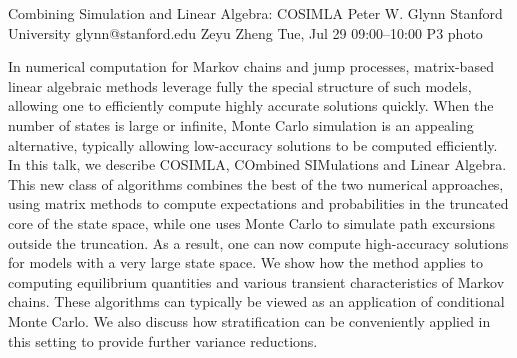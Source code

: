 \documentclass[12pt,lettersize,oneside]{book} %
\begin{document}
\clearpage
\begin{talk}
  {Combining Simulation and Linear Algebra: COSIMLA}%
  {Peter W. Glynn}%
  {Stanford University}%
  {glynn@stanford.edu}%
  {Zeyu Zheng}%
  {}%
  {Tue, Jul 29 09:00--10:00}%
  {P3}%
  {photo}%
  
    
   
In numerical computation for Markov chains and jump processes, matrix-based linear algebraic methods leverage fully the special structure of such models, allowing one to efficiently compute highly accurate solutions quickly. When the number of states is large or infinite, Monte Carlo simulation is an appealing alternative, typically allowing low-accuracy solutions to be computed efficiently. In this talk, we describe COSIMLA, COmbined SIMulations and Linear Algebra. This new class of algorithms combines the best of the two numerical approaches, using matrix methods to compute expectations and probabilities in the truncated core of the state space, while one uses Monte Carlo to simulate path excursions outside the truncation. As a result, one can now compute high-accuracy solutions for models with a very large state space. We show how the method applies to computing equilibrium quantities and various transient characteristics of Markov chains. These algorithms can typically be viewed as an application of conditional Monte Carlo. We also discuss how stratification can be conveniently applied in this setting to provide further variance reductions.  

\end{talk}
\end{document}
